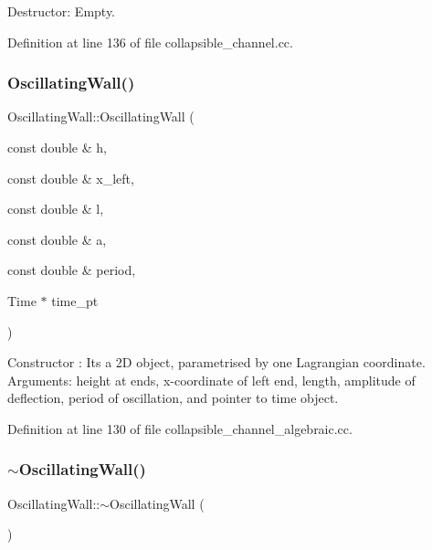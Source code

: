 Destructor\+: Empty. 



Definition at line 136 of file collapsible\+\_\+channel.\+cc.

\mbox{\label{classOscillatingWall_a5ededc3d27eef5c4ef7e82ac5cdf6ff9}} 
\subsubsection{\texorpdfstring{Oscillating\+Wall()}{OscillatingWall()}\hspace{0.1cm}{\footnotesize\ttfamily [2/2]}}
{\footnotesize\ttfamily Oscillating\+Wall\+::\+Oscillating\+Wall (\begin{DoxyParamCaption}\item[{const double \&}]{h,  }\item[{const double \&}]{x\+\_\+left,  }\item[{const double \&}]{l,  }\item[{const double \&}]{a,  }\item[{const double \&}]{period,  }\item[{Time $\ast$}]{time\+\_\+pt }\end{DoxyParamCaption})\hspace{0.3cm}{\ttfamily [inline]}}



Constructor \+: It\textquotesingle{}s a 2D object, parametrised by one Lagrangian coordinate. Arguments\+: height at ends, x-\/coordinate of left end, length, amplitude of deflection, period of oscillation, and pointer to time object. 



Definition at line 130 of file collapsible\+\_\+channel\+\_\+algebraic.\+cc.

\mbox{\label{classOscillatingWall_adc35b40bdd733a244d6399d91fa20ade}} 
\subsubsection{\texorpdfstring{$\sim$\+Oscillating\+Wall()}{~OscillatingWall()}\hspace{0.1cm}{\footnotesize\ttfamily [2/2]}}
{\footnotesize\ttfamily Oscillating\+Wall\+::$\sim$\+Oscillating\+Wall (\begin{DoxyParamCaption}{ }\end{DoxyParamCaption})\hspace{0.3cm}{\ttfamily [inline]}}



